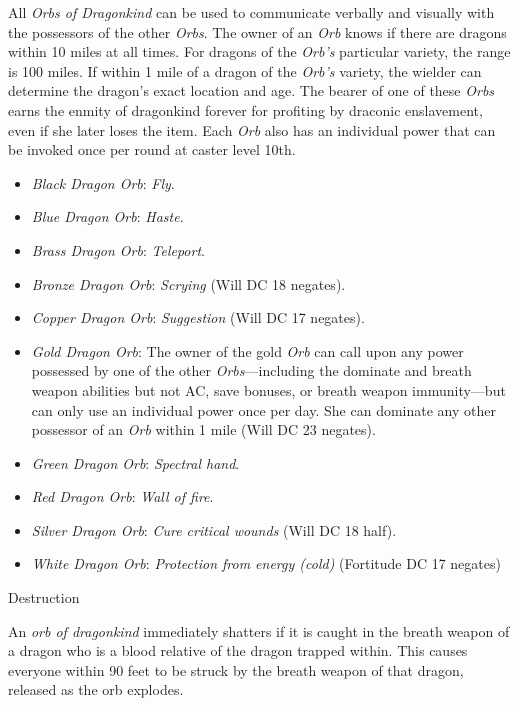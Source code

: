 All \textit{Orbs of Dragonkind} can be used to communicate verbally and visually with the possessors of the other \textit{Orbs}. The owner of an \textit{Orb} knows if there are dragons within 10 miles at all times. For dragons of the \textit{Orb's} particular variety, the range is 100 miles. If within 1 mile of a dragon of the \textit{Orb's} variety, the wielder can determine the dragon's exact location and age. The bearer of one of these \textit{Orbs} earns the enmity of dragonkind forever for profiting by draconic enslavement, even if she later loses the item. Each \textit{Orb} also has an individual power that can be invoked once per round at caster level 10th.
				\begin{itemize}\item  \textit{Black Dragon Orb}: \textit{Fly}.
				\item  \textit{Blue Dragon Orb}: \textit{Haste}.
				\item  \textit{Brass Dragon Orb}: \textit{Teleport}.
				\item  \textit{Bronze Dragon Orb}: \textit{Scrying} (Will DC 18 negates).
				\item  \textit{Copper Dragon Orb}: \textit{Suggestion} (Will DC 17 negates).
				\item  \textit{Gold Dragon Orb}: The owner of the gold \textit{Orb} can call upon any power possessed by one of the other \textit{Orbs}---including the dominate and breath weapon abilities but not AC, save bonuses, or breath weapon immunity---but can only use an individual power once per day. She can dominate any other possessor of an \textit{Orb} within 1 mile (Will DC 23 negates).
				\item  \textit{Green Dragon Orb}: \textit{Spectral hand}.
				\item  \textit{Red Dragon Orb}: \textit{Wall of fire}.
				\item  \textit{Silver Dragon Orb}: \textit{Cure critical wounds} (Will DC 18 half).
				\item  \textit{White Dragon Orb}: \textit{Protection from energy (cold)} (Fortitude DC 17 negates)
\end{itemize}
				
Destruction
				
An \textit{orb of dragonkind} immediately shatters if it is caught in the breath weapon of a dragon who is a blood relative of the dragon trapped within. This causes everyone within 90 feet to be struck by the breath weapon of that dragon, released as the orb explodes.
				

